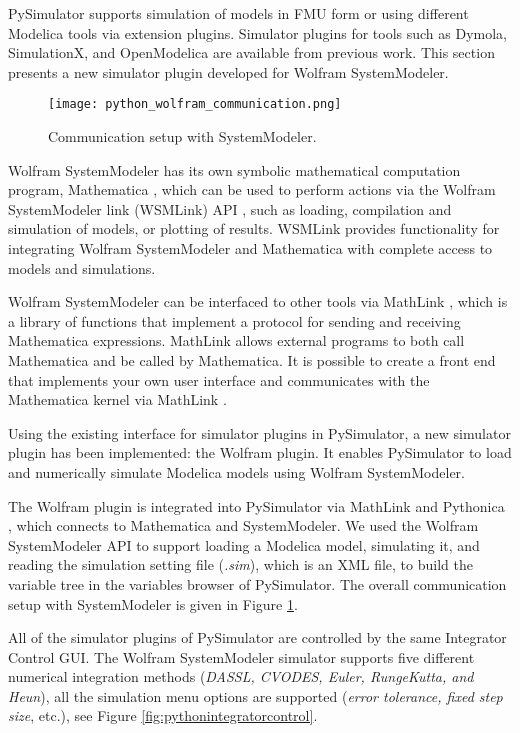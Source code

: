 PySimulator supports simulation of models in FMU form or using different Modelica tools via extension
plugins. Simulator plugins for tools such as Dymola, SimulationX, and OpenModelica are available from previous work. 
This section presents a new simulator plugin developed for Wolfram SystemModeler.

\begin{figure}
	\texttt{[image: python\_wolfram\_communication.png]}
	\caption{Communication setup with SystemModeler.}
	\label{fig:pythonwolframcommunication}
\end{figure}

Wolfram SystemModeler has its own symbolic mathematical computation program, Mathematica \cite{mathematica}, which can be used
to perform actions via the Wolfram SystemModeler link (WSMLink) API \cite{wsmlink}, such as loading, compilation and 
simulation of models, or plotting of results. WSMLink provides functionality for integrating Wolfram SystemModeler and Mathematica  
with complete access to models and simulations.

Wolfram SystemModeler can be interfaced to other tools via MathLink \cite{mathlink}, which is a library of functions that 
implement a protocol for sending and receiving Mathematica expressions. MathLink \cite{mathlinktutorial,mathlink} allows external
programs to both call Mathematica and be called by Mathematica. It is possible to create a front end that 
implements your own user interface and communicates with the Mathematica kernel via MathLink \cite{mathlinkc}.

Using the existing interface for simulator plugins in PySimulator, a new simulator plugin has
been implemented: the Wolfram plugin. It enables PySimulator to load and numerically simulate
Modelica models using Wolfram SystemModeler.

The Wolfram plugin is integrated into PySimulator via MathLink and Pythonica \cite{pythonica}, which connects to Mathematica and
SystemModeler. We used the Wolfram SystemModeler API to support loading a Modelica model, simulating
it, and reading the simulation setting file (\textit{.sim}), which is an XML file, to build the variable tree in the
variables browser of PySimulator. The overall communication setup with SystemModeler is given in
Figure \ref{fig:pythonwolframcommunication}.

All of the simulator plugins of PySimulator are controlled by the same Integrator Control GUI. The Wolfram
SystemModeler simulator supports five different numerical integration methods (\textit{DASSL, CVODES,
Euler, RungeKutta, and Heun}), all the simulation menu options are supported (\textit{error tolerance, fixed step
size}, etc.), see Figure \ref{fig:pythonintegratorcontrol}.

